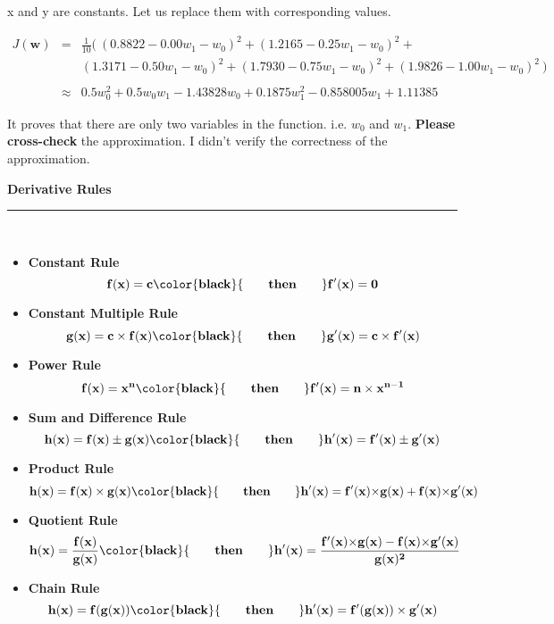\documentclass[12pt]{article}
\newcommand{\drule}[1]{{\color{blue} {\large \[\mathbf{#1}\]}}}
\newcommand{\drtext}[1]{{\color{black} {\qquad #1 \qquad }}}
\begin{document}
\vspace{3mm}

\noindent x and y are constants. Let us replace them with corresponding values.


\begin{eqnarray*}
J(\mathbf{w}) & = & \frac{1}{10} (\ (0.8822 -  0.00 w_1 - w_0)^2 + 
      (1.2165 - 0.25 w_1 - w_0)^2 + \\ 
& &   (1.3171 - 0.50 w_1 - w_0)^2 + 
     (1.7930 - 0.75 w_1 - w_0)^2 + 
      (1.9826 - 1.00 w_1 - w_0)^2\ ) \\
\\
& \approx & 0.5 w_0^2 + 0.5 w_0 w_1 - 1.43828 w_0 + 0.1875 w_1^2 - 0.858005 w_1 + 1.11385 
\end{eqnarray*}

\vspace{2mm}
 
It proves that there are only two variables in the function. i.e. $w_0$ and $w_1$. 
\textbf{Please cross-check} the approximation. I didn't verify the correctness of the approximation. 


\break
{\Large \textbf{Derivative Rules}} \\
\rule{\textwidth}{1pt}
\vspace{1mm} \\
\begin{itemize}
 \item \textbf{Constant Rule}
 	\drule{f(x) = c \drtext{then} f'(x) = 0} 
 \item \textbf{Constant Multiple Rule}
	\drule{g(x) = c \times f(x) \drtext{then} g'(x) = c \times f'(x)}
 \item \textbf{Power Rule}
	\drule{f(x) = x^n \drtext{then} f'(x) = n \times x^{n-1}}
 \item \textbf{Sum and Difference Rule}
	\drule{h(x) = f(x) \pm g(x) \drtext{then} h'(x) = f'(x) \pm g'(x)}
 \item \textbf{Product Rule}
	\drule{h(x) = f(x) \times g(x) \drtext{then} h'(x) = f'(x){\times}g(x) + f(x){\times}g'(x)}
 \item \textbf{Quotient Rule}
	\drule{h(x) = \frac{f(x)}{g(x)} \drtext{then} h'(x) = \frac{f'(x){\times}g(x) - f(x){\times}g'(x)}{g(x)^2}}
 \item \textbf{Chain Rule} 
	\drule{h(x) = f(g(x)) \drtext{then} h'(x) = f'(g(x)) \times g'(x)}
\end{itemize}
\end{document}
